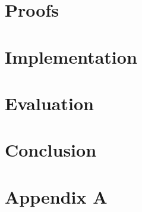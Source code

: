 \documentclass[master=cws,masteroption=ai]{kulemt}
\begin{document}
\chapter{Proofs}


\chapter{Implementation}


\chapter{Evaluation}


\chapter{Conclusion}


\appendixpage*          %
\appendix
\chapter{Appendix A}


\backmatter



\end{document}
